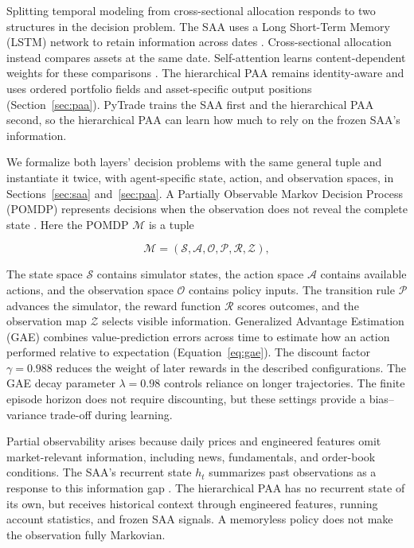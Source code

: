 Splitting temporal modeling from cross-sectional allocation responds to two structures in the decision problem. The SAA uses a Long Short-Term Memory (LSTM) network to retain information across dates \cite{Hochreiter1997}. Cross-sectional allocation instead compares assets at the same date. Self-attention learns content-dependent weights for these comparisons \cite{vaswani2017}. The hierarchical PAA remains identity-aware and uses ordered portfolio fields and asset-specific output positions (Section~\ref{sec:paa}). PyTrade trains the SAA first and the hierarchical PAA second, so the hierarchical PAA can learn how much to rely on the frozen SAA's information.

We formalize both layers' decision problems with the same general tuple and instantiate it twice, with agent-specific state, action, and observation spaces, in Sections~\ref{sec:saa} and~\ref{sec:paa}. A Partially Observable Markov Decision Process (POMDP) represents decisions when the observation does not reveal the complete state \cite{SuttonBarto}. Here the POMDP \(\mathcal M\) is a tuple

\begin{equation}
\mathcal{M} = (\mathcal{S}, \mathcal{A}, \mathcal{O}, \mathcal{P}, \mathcal{R}, \mathcal{Z}),
\end{equation}

The state space $\mathcal{S}$ contains simulator states, the action space $\mathcal{A}$ contains available actions, and the observation space $\mathcal{O}$ contains policy inputs. The transition rule $\mathcal{P}$ advances the simulator, the reward function $\mathcal{R}$ scores outcomes, and the observation map $\mathcal{Z}$ selects visible information. Generalized Advantage Estimation (GAE) combines value-prediction errors across time to estimate how an action performed relative to expectation (Equation~\eqref{eq:gae}). The discount factor $\gamma=0.988$ reduces the weight of later rewards in the described configurations. The GAE decay parameter $\lambda=0.98$ controls reliance on longer trajectories. The finite episode horizon does not require discounting, but these settings provide a bias--variance trade-off during learning.


Partial observability arises because daily prices and engineered features omit market-relevant information, including news, fundamentals, and order-book conditions. The SAA's recurrent state \(h_t\) summarizes past observations as a response to this information gap \cite{hausknecht2015deep}. The hierarchical PAA has no recurrent state of its own, but receives historical context through engineered features, running account statistics, and frozen SAA signals. A memoryless policy does not make the observation fully Markovian.

